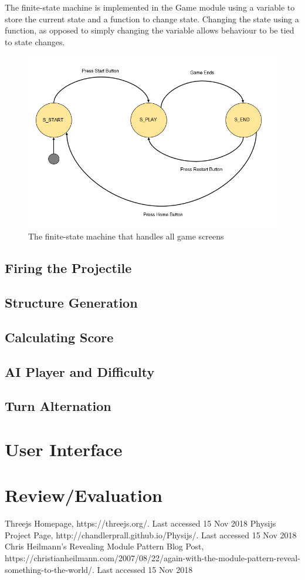 \documentclass[runningheads]{llncs}
\begin{document}
	The finite-state machine is implemented in the Game module using a variable to store the current state and a function to change state. Changing the state using a function, as opposed to simply changing the variable allows behaviour to be tied to state changes.
	\newpage
	\begin{figure}
		\centering
		\includegraphics[width=\textwidth]{./img/fsm.png}
		\caption{The finite-state machine that handles all game screens}
		\label{fsm}
	\end{figure}
	\subsection{Firing the Projectile}
	\subsection{Structure Generation}
	\subsection{Calculating Score}
	\subsection{AI Player and Difficulty}
	\subsection{Turn Alternation}
	
	\section{User Interface}
	\section{Review/Evaluation}
	
	\newpage
	\begin{thebibliography}{8}
		Threejs Homepage, https://threejs.org/. Last accessed 15 Nov 2018
		Physijs Project Page, http://chandlerprall.github.io/Physijs/. Last accessed 15 Nov 2018
		Chris Heilmann's Revealing Module Pattern Blog Post, https://christianheilmann.com/2007/08/22/again-with-the-module-pattern-reveal-something-to-the-world/. Last accessed 15 Nov 2018
	\end{thebibliography}
\end{document}
